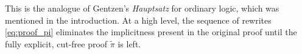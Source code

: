 \documentclass[english,letter paper,12pt,reqno]{article}
\theoremstyle{example}
\begin{document}
This is the analogue of Gentzen's \emph{Hauptsatz} for ordinary logic, which was mentioned in the introduction. At a high level, the sequence of rewrites \eqref{eq:proof_pi} eliminates the implicitness present in the original proof until the fully explicit, cut-free proof $\widetilde{\pi}$ is left. %
\end{document}
